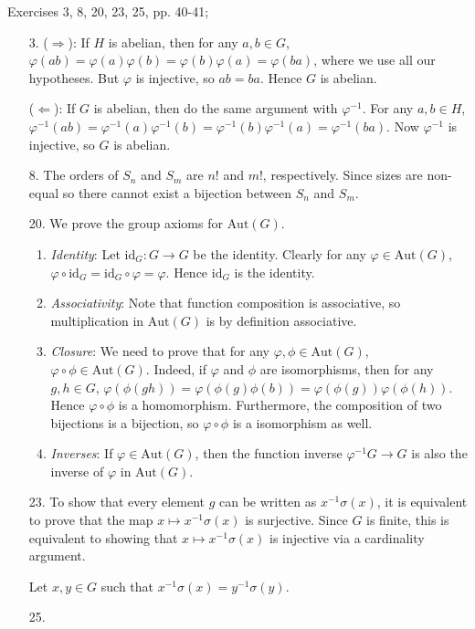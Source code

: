 \documentclass[12pt]{article}
\theoremstyle{remark}
\theoremstyle{named}
\begin{document}
Exercises 3, 8, 20, 23, 25, pp. 40-41;

\begin{enumerate}
    \item [3.] ($\Rightarrow$): If $H$ is abelian, then for any $a, b \in G$, $\varphi(ab) = \varphi(a)\varphi(b) = \varphi(b)\varphi(a) = \varphi(ba)$, where we use all our hypotheses. But $\varphi$ is injective, so $ab = ba$. Hence $G$ is abelian.
    
    ($\Leftarrow$): If $G$ is abelian, then do the same argument with $\varphi^{-1}$. For any $a, b \in H$, $\varphi^{-1}(ab) = \varphi^{-1}(a) \varphi^{-1}(b) = \varphi^{-1}(b)\varphi^{-1}(a) = \varphi^{-1}(ba)$. Now $\varphi^{-1}$ is injective, so $G$ is abelian.
    \item [8.] The orders of $S_n$ and $S_m$ are $n!$ and $m!$, respectively. Since sizes are non-equal so there cannot exist a bijection between $S_n$ and $S_m$.
    
    \item [20.] We prove the group axioms for $\text{Aut}(G)$.
    
    \begin{enumerate}
        \item \textit{Identity}: Let $\text{id}_G : G \to G$ be the identity. Clearly for any $\varphi \in \text{Aut}(G)$, $\varphi \circ \text{id}_G = \text{id}_G \circ \varphi = \varphi$. Hence $\text{id}_G$ is the identity. 
        \item \textit{Associativity}: Note that function composition is associative, so multiplication in $\text{Aut}(G)$ is by definition associative.
        \item \textit{Closure}: We need to prove that for any $\varphi, \phi \in \text{Aut}(G)$, $\varphi \circ \phi \in \text{Aut}(G)$. Indeed, if $\varphi$ and $\phi$ are isomorphisms, then for any $g, h \in G$, $\varphi(\phi(gh)) = \varphi(\phi(g)\phi(b)) = \varphi(\phi(g)) \varphi(\phi(h))$. Hence $\varphi \circ \phi$ is a homomorphism. Furthermore, the composition of two bijections is a bijection, so $\varphi \circ \phi$ is a isomorphism as well.
        \item \textit{Inverses}: If $\varphi \in \text{Aut}(G)$, then the function inverse $\varphi^{-1} G \to G$ is also the inverse of $\varphi$ in $\text{Aut}(G)$.
    \end{enumerate}

    \item [23.] To show that every element $g$ can be written as $x^{-1} \sigma(x)$, it is equivalent to prove that the map $x \mapsto x^{-1}\sigma(x)$ is surjective. Since $G$ is finite, this is equivalent to showing that $x \mapsto x^{-1}\sigma(x)$ is injective via a cardinality argument.
    
    Let $x, y \in G$ such that $x^{-1}\sigma(x) = y^{-1}\sigma(y)$. 

    \item [25.] 
\end{enumerate}
\end{document}
